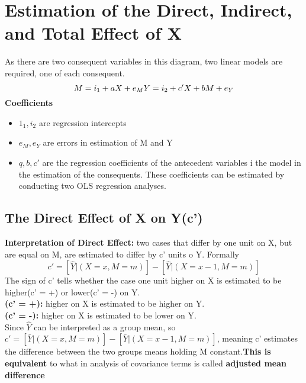 \documentclass{article}
\theoremstyle{definition}
\begin{document}
\section{Estimation of the Direct, Indirect, and Total Effect of X}
As there are two consequent variables in this diagram, two linear models are required, one of each consequent.
\begin{equation*}
	M = i_1+aX+e_M\\
	Y = i_2+c'X+bM+e_Y
\end{equation*}
\textbf{Coefficients}
\begin{itemize}
	\item $1_1,i_2$ are regression intercepts
	\item $e_M, e_Y$ are errors in estimation of M and Y
	\item $q,b,c'$ are the regression coefficients of the antecedent variables i the model in the estimation of the consequents. These coefficients can be estimated by conducting two OLS regression analyses.
\end{itemize}

\subsection{The Direct Effect of X on Y(c')}
\textbf{Interpretation of Direct Effect: }two cases that differ by one unit on X, but are equal on M, are estimated to differ by c' units o Y. Formally
\begin{equation*}
	c' = [\hat{Y}| (X=x,M=m)]-[\hat{Y}| (X=x-1,M=m)]
\end{equation*}
The sign of c' tells whether the case one unit higher on X is estimated to be higher(c' = +) or lower(c' = -) on Y. \\
\textbf{(c' = +): }higher on X is estimated to be higher on Y.\\
\textbf{(c' = -): }higher on X is estimated to be lower on Y.\\
Since $\hat{Y}$ can be interpreted as a group mean, so $c' = [\bar{Y}| (X=x,M=m)]-[\bar{Y}| (X=x-1,M=m)]$, meaning c' estimates the difference between the two groups means holding M constant.\textbf{This is equivalent} to what in analysis of covariance terms is called \textbf{adjusted mean difference}
\end{document}
